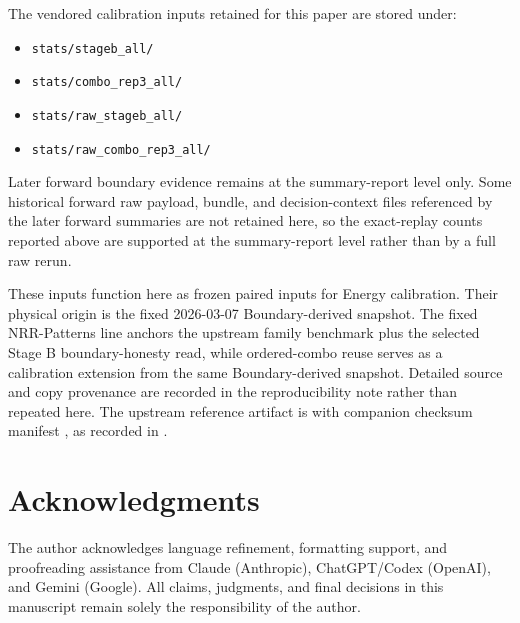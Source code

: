 \documentclass[11pt,a4paper]{article}
\begin{document}
The vendored calibration inputs retained for this paper are stored under:
\begin{itemize}
  \item \texttt{stats/stageb\_all/}
  \item \texttt{stats/combo\_rep3\_all/}
  \item \texttt{stats/raw\_stageb\_all/}
  \item \texttt{stats/raw\_combo\_rep3\_all/}
\end{itemize}

Later forward boundary evidence remains at the summary-report level only. Some
historical forward raw payload, bundle, and decision-context files referenced
by the later forward summaries are not retained here, so the exact-replay
counts reported above are supported at the summary-report level rather than by
a full raw rerun.

These inputs function here as frozen paired inputs for Energy calibration.
Their physical origin is the fixed 2026-03-07 Boundary-derived snapshot. The
fixed NRR-Patterns line anchors the upstream family benchmark plus the selected
Stage B boundary-honesty read, while ordered-combo reuse serves as a
calibration extension from the same Boundary-derived snapshot. Detailed source
and copy provenance are recorded in the reproducibility note rather than
repeated here. The upstream reference artifact is
 with companion
checksum manifest , as recorded in
.

\section*{Acknowledgments}

The author acknowledges language refinement, formatting support, and
proofreading assistance from Claude (Anthropic), ChatGPT/Codex (OpenAI), and
Gemini (Google). All claims, judgments, and final decisions in this manuscript
remain solely the responsibility of the author.
\end{document}
